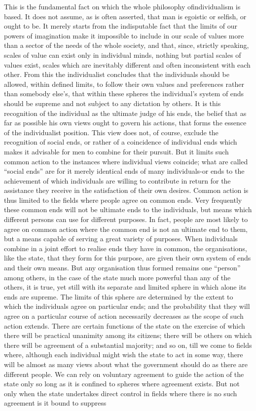\documentclass[11pt,openany]{book}
\begin{document}
This is the fundamental fact on which the whole philosophy ofindividualism is based. It does not assume, as is often asserted, that man is egoistic or selfish, or ought to be. It merely starts from the indisputable fact that the limits of our powers of imagination make it impossible to include in our scale of values more than a sector of the needs of the whole society, and that, since, strictly speaking, scales of value can exist only in individual minds, nothing but partial scales of values exist, scales which are inevitably different and often inconsistent with each other. From this the individualist concludes that the individuals should be allowed, within defined limits, to follow their own values and preferences rather than somebody else's, that within these spheres the individual's system of ends should be supreme and not subject to any dictation by others. It is this recognition of the individual as the ultimate judge of his ends, the belief that as far as possible his own views ought to govern his actions, that forms the essence of the individualist position. This view does not, of course, exclude the recognition of social ends, or rather of a coincidence of individual ends which makes it advisable for men to combine for their pursuit. But it limits such common action to the instances where individual views coincide; what are called ``social ends'' are for it merely identical ends of many individuals-or ends to the achievement of which individuals are willing to contribute in return for the assistance they receive in the satisfaction of their own desires. Common action is thus limited to the fields where people agree on common ends. Very frequently these common ends will not be ultimate ends to the individuals, but means which different persons can use for different purposes. In fact, people are most likely to agree on common action where the common end is not an ultimate end to them, but a means capable of serving a great variety of purposes. When individuals combine in a joint effort to realise ends they have in common, the organisations, like the state, that they form for this purpose, are given their own system of ends and their own means. But any organisation thus formed remains one ``person'' among others, in the case of the state much more powerful than any of the others, it is true, yet still with its separate and limited sphere in which alone its ends are supreme. The limits of this sphere are determined by the extent to which the individuals agree on particular ends; and the probability that they will agree on a particular course of action necessarily decreases as the scope of such action extends. There are certain functions of the state on the exercise of which there will be practical unanimity among its citizens; there will be others on which there will be agreement of a substantial majority; and so on, till we come to fields where, although each individual might wish the state to act in some way, there will be almost as many views about what the government should do as there are different people. We can rely on voluntary agreement to guide the action of the state only so long as it is confined to spheres where agreement exists. But not only when the state undertakes direct control in fields where there is no such agreement is it bound to suppress 
\end{document}
